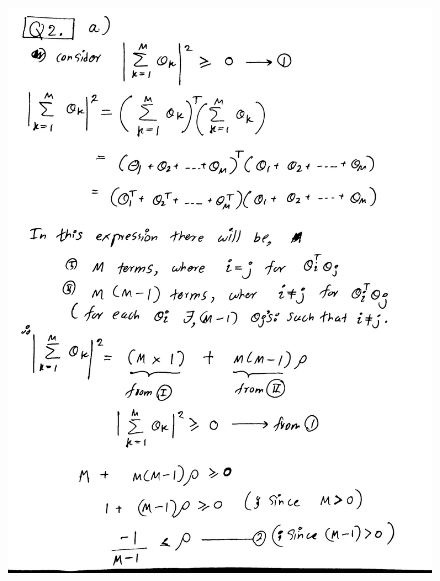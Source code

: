 \documentclass[a4paper,11pt]{article}%
\begin{document}
\begin{figure}[!h]
	\includegraphics[scale=0.22]{figures/img6}
\end{figure}
\end{document}

